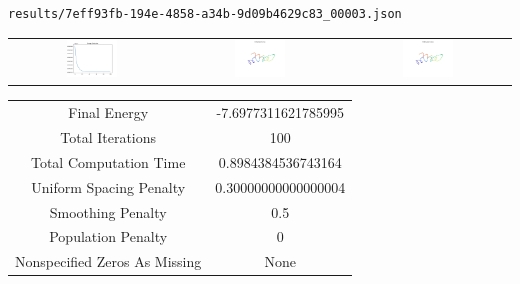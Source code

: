 \documentclass{report}
\begin{document}
\begin{lstlisting}
results/7eff93fb-194e-4858-a34b-9d09b4629c83_00003.json
\end{lstlisting}
\begin{tabular}{ccc}
\includegraphics[width=0.32\textwidth]{7eff93fb-194e-4858-a34b-9d09b4629c83_00003_energies.png}
&
\includegraphics[width=0.32\textwidth]{7eff93fb-194e-4858-a34b-9d09b4629c83_00003_initial_curves.png}
&
\includegraphics[width=0.32\textwidth]{7eff93fb-194e-4858-a34b-9d09b4629c83_00003_estimated_curves.png}
\\
\end{tabular}
\begin{tabular}{cc}
Final Energy&-7.6977311621785995\\
Total Iterations&100\\
Total Computation Time&0.8984384536743164\\
Uniform Spacing Penalty&0.30000000000000004\\
Smoothing Penalty&0.5\\
Population Penalty&0\\
Nonspecified Zeros As Missing&None\\
\end{tabular}
\end{document}
